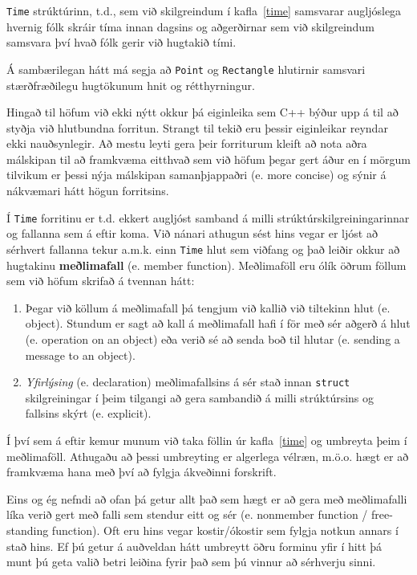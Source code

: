 {\tt Time} strúktúrinn, t.d., sem við skilgreindum í kafla~\ref{time}
samsvarar augljóslega hvernig fólk skráir tíma innan dagsins og 
aðgerðirnar sem við skilgreindum samsvara því hvað fólk gerir við hugtakið tími.

Á sambærilegan hátt má segja að {\tt Point} og
{\tt Rectangle} hlutirnir samsvari stærðfræðilegu hugtökunum hnit og rétthyrningur.

Hingað til höfum við ekki nýtt okkur þá eiginleika sem C++ býður upp á til að styðja við hlutbundna forritun.
Strangt til tekið eru þessir eiginleikar reyndar ekki nauðsynlegir.
Að mestu leyti gera þeir forriturum kleift að nota aðra málskipan til að framkvæma eitthvað sem við höfum þegar gert áður
en í mörgum tilvikum er þessi nýja málskipan samanþjappaðri (e. more concise) og sýnir á nákvæmari hátt högun forritsins. 
 
Í {\tt Time} forritinu er t.d. ekkert augljóst samband á milli strúktúrskilgreiningarinnar og fallanna sem á eftir koma.
Við nánari athugun sést hins vegar er ljóst að sérhvert fallanna tekur a.m.k. einn {\tt Time} hlut sem viðfang og það leiðir okkur að hugtakinu  {\bf meðlimafall} (e. member function).
Meðlimaföll eru ólík öðrum föllum sem við höfum skrifað á tvennan hátt:

\begin{enumerate}

\item Þegar við köllum á meðlimafall þá tengjum við kallið við tiltekinn hlut (e. object).
Stundum er sagt að kall á meðlimafall hafi í för með sér aðgerð á hlut (e. operation on an object) 
eða verið sé að senda boð til hlutar (e. sending a message to an object).

\item {\em Yfirlýsing} (e. declaration) meðlimafallsins á sér stað innan {\tt struct}
skilgreiningar í þeim tilgangi að gera sambandið á milli strúktúrsins og fallsins skýrt (e. explicit). 

\end{enumerate}

Í því sem á eftir kemur munum við taka föllin úr kafla~\ref{time} og umbreyta þeim í meðlimaföll.
Athugaðu að þessi umbreyting er algerlega vélræn, m.ö.o. hægt er að framkvæma hana með því að fylgja ákveðinni forskrift.


Eins og ég nefndi að ofan þá getur allt það sem hægt er að gera með meðlimafalli líka verið gert með falli sem stendur eitt og sér (e. nonmember function / free-standing function).
Oft eru hins vegar kostir/ókostir sem fylgja notkun annars í stað hins.
Ef þú getur á auðveldan hátt umbreytt öðru forminu yfir í hitt þá munt þú geta valið betri leiðina fyrir það sem þú vinnur að sérhverju sinni.

